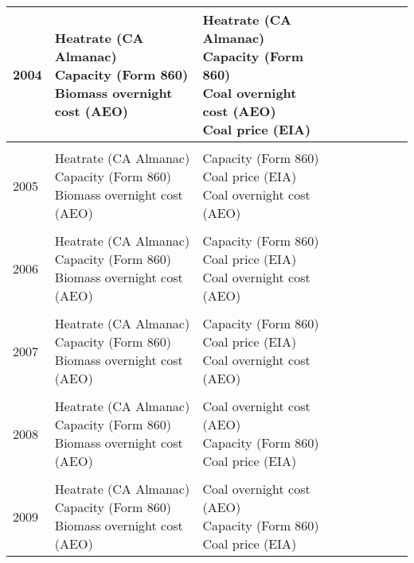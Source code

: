 \documentclass[10pt]{report}
\begin{document}
\begin{scriptsize}
\begin{landscape}
\begin{center}
\begin{longtable}{|lllllllll|}
2004 & \shortstack{Heatrate (CA Almanac) \\Capacity (Form 860) \\ Biomass overnight cost (AEO)}  &
\shortstack{Heatrate (CA Almanac) \\ Capacity (Form 860) \\ Coal overnight cost (AEO) \\ Coal price (EIA)} & \\
\hline \\
2005 & \shortstack{Heatrate (CA Almanac) \\ Capacity (Form 860) \\ Biomass overnight cost (AEO)}  &
\shortstack{Capacity (Form 860) \\ Coal price (EIA) \\ Coal overnight cost (AEO)} & \\
\hline \\
2006 & \shortstack{Heatrate (CA Almanac) \\ Capacity (Form 860) \\ Biomass overnight cost (AEO)} &
\shortstack{Capacity (Form 860) \\ Coal price (EIA) \\ Coal overnight cost (AEO)} & \\
\hline \\
2007 & \shortstack{Heatrate (CA Almanac) \\ Capacity (Form 860) \\ Biomass overnight cost (AEO)} &
\shortstack{Capacity (Form 860) \\ Coal price (EIA) \\ Coal overnight cost (AEO)} & \\
\hline \\
2008 & \shortstack{Heatrate (CA Almanac) \\ Capacity (Form 860) \\ Biomass overnight cost (AEO)} &
\shortstack{Coal overnight cost (AEO) \\ Capacity (Form 860) \\ Coal price (EIA)} & \\
\hline \\
2009 & \shortstack{Heatrate (CA Almanac) \\ Capacity (Form 860) \\ Biomass overnight cost (AEO) } &
\shortstack{Coal overnight cost (AEO) \\ Capacity (Form 860) \\ Coal price (EIA)} & \\

\end{longtable}
\end{center}
\end{landscape}
\end{scriptsize}
\end{document}
